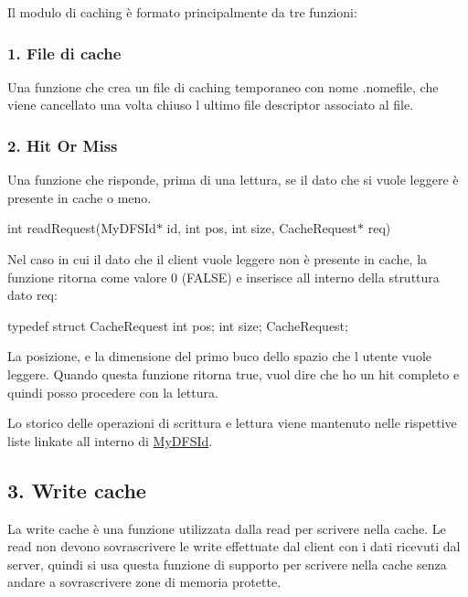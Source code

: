 Il modulo di caching è formato principalmente da tre funzioni\+:

\subsubsection*{1. File di cache}

Una funzione che crea un file di caching temporaneo con nome .nomefile, che viene cancellato una volta chiuso l\textquotesingle{} ultimo file descriptor associato al file.

\subsubsection*{2. Hit Or Miss}

Una funzione che risponde, prima di una lettura, se il dato che si vuole leggere è presente in cache o meno.

int read\+Request(\+My\+D\+F\+S\+Id$\ast$ id, int pos, int size, Cache\+Request$\ast$ req)

Nel caso in cui il dato che il client vuole leggere non è presente in cache, la funzione ritorna come valore 0 (F\+A\+L\+SE) e inserisce all\textquotesingle{} interno della struttura dato req\+: \begin{DoxyVerb}typedef struct CacheRequest {
    int pos;
    int size;
}CacheRequest;
\end{DoxyVerb}
 La posizione, e la dimensione del primo buco dello spazio che l\textquotesingle{} utente vuole leggere. Quando questa funzione ritorna true, vuol dire che ho un hit completo e quindi posso procedere con la lettura.

Lo storico delle operazioni di scrittura e lettura viene mantenuto nelle rispettive liste linkate all\textquotesingle{} interno di \hyperlink{structMyDFSId}{My\+D\+F\+S\+Id}.

\subsection*{3. Write cache}

La write cache è una funzione utilizzata dalla read per scrivere nella cache. Le read non devono sovrascrivere le write effettuate dal client con i dati ricevuti dal server, quindi si usa questa funzione di supporto per scrivere nella cache senza andare a sovrascrivere zone di memoria protette. 